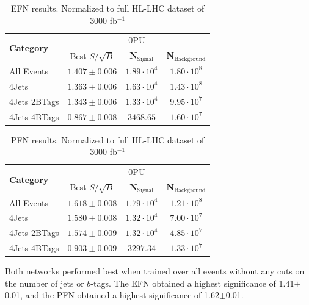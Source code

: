 \begin{table}[ht!]
\centering
    \begin{tabular}{|l|c|c|c|} %
      \hline\hline
      \multirow{2}{*}{\textbf{Category}} & \multicolumn{3}{c|}{0PU}\\
      \cline{2-4}
      & Best $S/\sqrt{B}$ & \textbf{N$_{\mathrm{Signal}}$} & \textbf{N$_{\mathrm{Background}}$} \\
      \hline
      All Events & $1.407 \pm 0.006$ & $1.89\cdot 10^4$ & $1.80\cdot 10^8$ \\
      4Jets & $1.363 \pm 0.006$ & $1.63\cdot 10^4$ & $1.43\cdot 10^8$ \\
      4Jets 2BTags & $1.343 \pm 0.006$ & $1.33\cdot 10^4$ & $9.95\cdot 10^7$ \\
      4Jets 4BTags & $0.867 \pm 0.008$ & $3468.65$ & $1.60\cdot 10^7$ \\
      \hline\hline
    \end{tabular}
    \caption{EFN results. Normalized to full HL-LHC dataset of 3000 fb$^{-1}$}
\label{EFNtab}
\end{table}

\begin{table}[ht!]
\centering
    \begin{tabular}{|l|c|c|c|} %
      \hline\hline
      \multirow{2}{*}{\textbf{Category}} & \multicolumn{3}{c|}{0PU}\\
      \cline{2-4}
      & Best $S/\sqrt{B}$ & \textbf{N$_{\mathrm{Signal}}$} & \textbf{N$_{\mathrm{Background}}$} \\
      \hline
      All Events & $1.618 \pm 0.008$ & $1.79\cdot 10^4$ & $1.21\cdot 10^8$ \\
      4Jets & $1.580 \pm 0.008$ & $1.32\cdot 10^4$ & $7.00\cdot 10^7$ \\
      4Jets 2BTags & $1.574 \pm 0.009$ & $1.32\cdot 10^4$ & $4.85\cdot 10^7$ \\
      4Jets 4BTags & $0.903 \pm 0.009$ & $3297.34$ & $1.33\cdot 10^7$ \\
      \hline\hline
    \end{tabular}
    \caption{PFN results. Normalized to full HL-LHC dataset of 3000 fb$^{-1}$}
\label{PFNtab}
\end{table}

Both networks performed best when trained over all events without any cuts on the number of jets or $b$-tags. The EFN obtained a highest significance of 1.41$\pm$0.01, and the PFN obtained a highest significance of 1.62$\pm$0.01.
